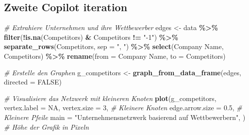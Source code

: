 \documentclass[
]{article}
\newenvironment{Shaded}{\begin{snugshade}}{\end{snugshade}}
\newcommand{\AttributeTok}[1]{\textcolor[rgb]{0.13,0.29,0.53}{#1}}
\newcommand{\CommentTok}[1]{\textcolor[rgb]{0.56,0.35,0.01}{\textit{#1}}}
\newcommand{\ConstantTok}[1]{\textcolor[rgb]{0.56,0.35,0.01}{#1}}
\newcommand{\DecValTok}[1]{\textcolor[rgb]{0.00,0.00,0.81}{#1}}
\newcommand{\FloatTok}[1]{\textcolor[rgb]{0.00,0.00,0.81}{#1}}
\newcommand{\FunctionTok}[1]{\textcolor[rgb]{0.13,0.29,0.53}{\textbf{#1}}}
\newcommand{\NormalTok}[1]{#1}
\newcommand{\OtherTok}[1]{\textcolor[rgb]{0.56,0.35,0.01}{#1}}
\newcommand{\SpecialCharTok}[1]{\textcolor[rgb]{0.81,0.36,0.00}{\textbf{#1}}}
\newcommand{\StringTok}[1]{\textcolor[rgb]{0.31,0.60,0.02}{#1}}
\begin{document}
\subsection{Zweite Copilot iteration}\label{zweite-copilot-iteration}

\begin{Shaded}
\begin{Highlighting}[]
\CommentTok{\# Extrahiere Unternehmen und ihre Wettbewerber}
\NormalTok{edges }\OtherTok{\textless{}{-}}\NormalTok{ data }\SpecialCharTok{\%\textgreater{}\%}
  \FunctionTok{filter}\NormalTok{(}\SpecialCharTok{!}\FunctionTok{is.na}\NormalTok{(Competitors) }\SpecialCharTok{\&}\NormalTok{ Competitors }\SpecialCharTok{!=} \StringTok{"{-}1"}\NormalTok{) }\SpecialCharTok{\%\textgreater{}\%}
  \FunctionTok{separate\_rows}\NormalTok{(Competitors, }\AttributeTok{sep =} \StringTok{", "}\NormalTok{) }\SpecialCharTok{\%\textgreater{}\%}
  \FunctionTok{select}\NormalTok{(}\StringTok{\textasciigrave{}}\AttributeTok{Company Name}\StringTok{\textasciigrave{}}\NormalTok{, Competitors) }\SpecialCharTok{\%\textgreater{}\%}
  \FunctionTok{rename}\NormalTok{(}\AttributeTok{from =} \StringTok{\textasciigrave{}}\AttributeTok{Company Name}\StringTok{\textasciigrave{}}\NormalTok{, }\AttributeTok{to =}\NormalTok{ Competitors)}

\CommentTok{\# Erstelle den Graphen}
\NormalTok{g\_competitors }\OtherTok{\textless{}{-}} \FunctionTok{graph\_from\_data\_frame}\NormalTok{(edges, }\AttributeTok{directed =} \ConstantTok{FALSE}\NormalTok{)}

\CommentTok{\# Visualisiere das Netzwerk mit kleineren Knoten}
\FunctionTok{plot}\NormalTok{(g\_competitors, }\AttributeTok{vertex.label =} \ConstantTok{NA}\NormalTok{,}
     \AttributeTok{vertex.size =} \DecValTok{3}\NormalTok{,  }\CommentTok{\# Kleinere Knoten}
     \AttributeTok{edge.arrow.size =} \FloatTok{0.5}\NormalTok{,  }\CommentTok{\# Kleinere Pfeile}
     \AttributeTok{main =} \StringTok{"Unternehmensnetzwerk basierend auf Wettbewerbern"}\NormalTok{,}
\NormalTok{    )  }\CommentTok{\# Höhe der Grafik in Pixeln}
\end{Highlighting}
\end{Shaded}
\end{document}
